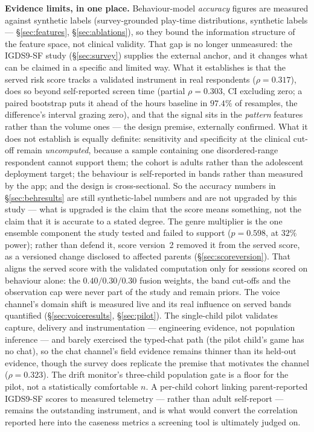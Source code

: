 \documentclass[11pt,a4paper]{article}
\begin{document}
\textbf{Evidence limits, in one place.} Behaviour-model \emph{accuracy} figures
are measured against synthetic labels (survey-grounded play-time distributions,
synthetic labels --- \S\ref{sec:features}, \S\ref{sec:ablations}), so they bound
the information structure of the feature space, not clinical validity. That gap
is no longer unmeasured: the IGDS9-SF study (\S\ref{sec:survey}) supplies the
external anchor, and it changes what can be claimed in a specific and limited
way. What it establishes is that the served risk score tracks a validated
instrument in real respondents ($\rho = 0.317$), does so beyond self-reported
screen time (partial $\rho = 0.303$, CI excluding zero; a paired bootstrap
puts it ahead of the hours baseline in $97.4\%$ of resamples, the
difference's interval grazing zero), and that the signal sits in the
\emph{pattern} features rather than the volume ones --- the design premise,
externally confirmed. What it does not establish is equally definite:
sensitivity and specificity at the clinical cut-off remain \emph{uncomputed},
because a sample containing one disordered-range respondent cannot support
them; the cohort is adults rather than the adolescent deployment target; the
behaviour is self-reported in bands rather than measured by the app; and the
design is cross-sectional. So the accuracy numbers in \S\ref{sec:behresults} are
still synthetic-label numbers and are not upgraded by this study --- what is
upgraded is the claim that the score means something, not the claim that it is
accurate to a stated degree. The genre multiplier is the one ensemble component
the study tested and failed to support ($p = 0.598$, at $32\%$ power); rather than
defend it, score version~2 removed it from the served score, as a versioned change
disclosed to affected parents (\S\ref{sec:scoreversion}). That aligns the served
score with the validated computation only for sessions scored on behaviour alone:
the $0.40/0.30/0.30$ fusion weights, the band cut-offs and the observation cap were
never part of the study and remain priors.
The voice channel's domain shift is measured live and its real influence on
served bands quantified (\S\ref{sec:voiceresults}, \S\ref{sec:pilot}). The
single-child pilot validates capture, delivery and instrumentation ---
engineering evidence, not population inference --- and barely exercised the
typed-chat path (the pilot child's game has no chat), so the chat channel's
field evidence remains thinner than its held-out evidence, though the survey
does replicate the premise that motivates the channel ($\rho = 0.323$). The
drift monitor's three-child population gate is a floor for the pilot, not a
statistically comfortable $n$. A per-child cohort linking parent-reported
IGDS9-SF scores to measured telemetry --- rather than adult self-report ---
remains the outstanding instrument, and is what would convert the correlation
reported here into the caseness metrics a screening tool is ultimately judged
on.
\end{document}
